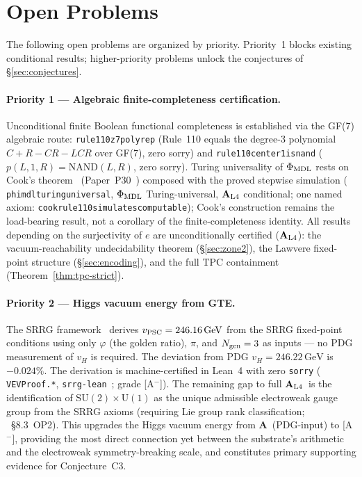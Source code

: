 \documentclass[12pt,letterpaper]{article}
\newcommand{\catAL}{\ensuremath{\textbf{A}_{\rm L4}}}
\newcommand{\catA}{\textbf{A}}
\newcommand{\lean}[1]{%
  \penalty-100
  \begingroup\def\_{\textunderscore\allowbreak}\texttt{#1}\endgroup}
\begin{document}

\section{Open Problems}
\label{sec:open}

The following open problems are organized by priority.  Priority~1 blocks
existing conditional results; higher-priority problems unlock the conjectures
of \S\ref{sec:conjectures}.

\paragraph{Priority 1 --- Algebraic finite-completeness certification.}
Unconditional finite Boolean functional completeness is established via the GF(7)
algebraic route: \lean{rule110\_z7\_poly\_rep} (Rule~110 equals the degree-3 polynomial
$C+R-CR-LCR$ over GF(7), zero sorry) and
\lean{rule110\_center1\_is\_nand} ($p(L,1,R) = \mathrm{NAND}(L,R)$, zero sorry).
Turing universality of $\Phi_{\rm MDL}$ rests on Cook's theorem~\cite{Cook2004}
(Paper~P30~\cite{SpivackCookTheorem}) composed with the proved stepwise simulation
(\lean{phimdl\_turing\_universal}, $\Phi_{\rm MDL}$ Turing-universal, \catAL{} conditional;
one named axiom: \lean{cook\_rule110\_simulates\_computable}); Cook's construction remains
the load-bearing result, not a corollary of the finite-completeness identity.
All results depending on the surjectivity of $e$ are unconditionally certified
(\catAL): the vacuum-reachability undecidability theorem (\S\ref{sec:zone2}), the Lawvere fixed-point structure
(\S\ref{sec:encoding}), and the full TPC containment (Theorem~\ref{thm:tpc-strict}).

\paragraph{Priority 2 --- Higgs vacuum energy from GTE.}
The SRRG framework~\cite{SpivackSRRG} derives $v_{\rm PSC} = 246.16\,\mathrm{GeV}$
from the SRRG fixed-point conditions using only $\varphi$ (the golden ratio), $\pi$,
and $N_{\rm gen} = 3$ as inputs --- no PDG measurement of $v_H$ is required.
The deviation from PDG $v_H = 246.22\,\mathrm{GeV}$ is $-0.024\%$.
The derivation is machine-certified in Lean~4 with zero \texttt{sorry}
(\lean{VEVProof.*}, \texttt{srrg-lean}~\cite{srrg-lean}; grade [A$^-$]).
The remaining gap to full \catAL\ is the identification of
$\mathrm{SU}(2)\!\times\!\mathrm{U}(1)$ as the unique admissible electroweak gauge group
from the SRRG axioms (requiring Lie group rank classification;
\cite{SpivackSRRG}~\S8.3~OP2).
This upgrades the Higgs vacuum energy from \catA\ (PDG-input) to [A$^-$], providing
the most direct connection yet between the substrate's arithmetic and the electroweak
symmetry-breaking scale, and constitutes primary supporting evidence for Conjecture~C3.
\end{document}

